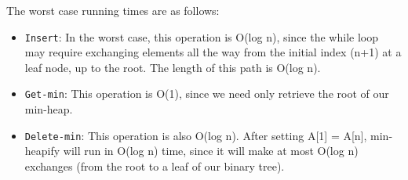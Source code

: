 \documentclass[paper=a4, fontsize=11pt]{scrartcl} %
\numberwithin{equation}{section} %
\numberwithin{figure}{section} %
\numberwithin{table}{section} %
\begin{document}
 
The worst case running times are as follows:

\begin{itemize}
\item \texttt{Insert}: In the worst case, this operation is O(log n), since the while loop may require exchanging elements all the way from the initial index (n+1) at a leaf node, up to the root. The length of this path is O(log n).
\item \texttt{Get-min}: This operation is O(1), since we need only retrieve the root of our min-heap.
\item \texttt{Delete-min}: This operation is also O(log n). After setting A[1] = A[n], min-heapify will run in O(log n) time, since it will make at most O(log n) exchanges (from the root to a leaf of our binary tree).
\end{itemize}

 
\end{document}

